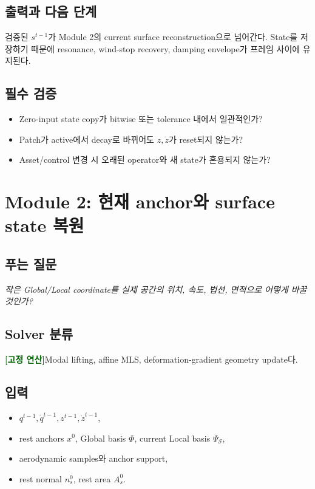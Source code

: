 \documentclass[11pt,a4paper]{article}
\newcommand{\deterministic}{\textcolor{darkgreen}{\textbf{[고정 연산]}}}
\begin{document}
\subsection*{출력과 다음 단계}

검증된 \(s^{t-1}\)가 Module 2의 current surface reconstruction으로 넘어간다.
State를 저장하기 때문에 resonance, wind-stop recovery, damping envelope가 프레임 사이에 유지된다.

\subsection*{필수 검증}

\begin{itemize}[leftmargin=1.5em]
  \item Zero-input state copy가 bitwise 또는 tolerance 내에서 일관적인가?
  \item Patch가 active에서 decay로 바뀌어도 \(z,\dot z\)가 reset되지 않는가?
  \item Asset/control 변경 시 오래된 operator와 새 state가 혼용되지 않는가?
\end{itemize}

\section{Module 2: 현재 anchor와 surface state 복원}

\subsection*{푸는 질문}

\emph{작은 Global/Local coordinate를 실제 공간의 위치, 속도, 법선, 면적으로 어떻게 바꿀 것인가?}

\subsection*{Solver 분류}

\deterministic Modal lifting, affine MLS, deformation-gradient geometry update다.

\subsection*{입력}

\begin{itemize}[leftmargin=1.5em]
  \item \(q^{t-1},\dot q^{t-1},z^{t-1},\dot z^{t-1}\),
  \item rest anchors \(x^0\), Global basis \(\Phi\), current Local basis \(\Psi_{\mathcal S}\),
  \item aerodynamic samples와 anchor support,
  \item rest normal \(n_s^0\), rest area \(A_s^0\).
\end{itemize}
\end{document}
